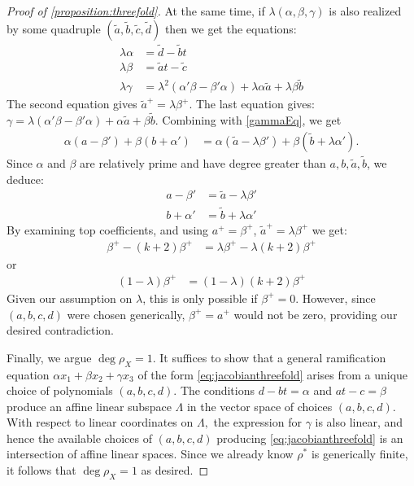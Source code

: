 \documentclass[11pt,reqno]{amsart}
\theoremstyle{plain}
\theoremstyle{definition}
\theoremstyle{remark}
\numberwithin{equation}{section}
\numberwithin{equation}{section}
\begin{document}
\begin{proof}[Proof of \autoref{proposition:threefold}]
	  At the same time, if $\lambda(\alpha, \beta, \gamma)$ is also realized by some quadruple $(\tilde{a}, \tilde{b}, \tilde{c}, \tilde{d})$ then we get the equations: 
	  \begin{align}\label{secondEquation}
	  	\lambda \alpha &= \tilde{d} - \tilde{b}t\\
	  	\lambda \beta &= \tilde{a}t - \tilde{c} \nonumber\\
	  	\lambda \gamma &= \lambda^{2}(\alpha'\beta - \beta' \alpha) + \lambda \alpha \tilde{a} + \lambda \beta \tilde{b}\nonumber
	  \end{align}
	  The second equation gives $\tilde{a}^{+} = \lambda \beta^{+}$.  The last equation gives: $\gamma = \lambda(\alpha'\beta - \beta' \alpha) + \alpha \tilde{a} + \beta \tilde{b}$.  Combining with \eqref{gammaEq}, we get 
	  \begin{align*}\label{alphasbetas}
	    	\alpha (a - \beta') + \beta (b + \alpha') &= \alpha(\tilde{a} - \lambda\beta') + \beta(\tilde{b} + \lambda \alpha').
	    \end{align*} 
	    Since $\alpha$ and $\beta$ are relatively prime and have degree greater than $a,b,\tilde{a},\tilde{b}$, we deduce:
	    \begin{align*}
	     	a-\beta' &= \tilde{a} - \lambda \beta'\\
	     	b+\alpha' &= \tilde{b} + \lambda \alpha'
	     \end{align*} 
	     By examining top coefficients, and using $a^{+} = \beta^{+}$, $\tilde{a}^{+} = \lambda \beta^{+}$ we get: 
	     \begin{align*}
	     	\beta^{+} - (k+2)\beta^{+} &= \lambda\beta^{+} - \lambda(k+2)\beta^{+}
	     \end{align*}
	     or 
	     \begin{align*}
	     	(1-\lambda)\beta^{+} &= (1-\lambda)(k+2)\beta^{+}
	     \end{align*}
	     Given our assumption on $\lambda$, this is only possible if $\beta^{+} = 0$.  However, since $(a,b,c,d)$ were chosen generically, $\beta^{+} = a^{+}$ would not be zero, providing our desired contradiction.

	     Finally, we argue $\deg \rho_{X} = 1$. It suffices to show that a general ramification equation $\alpha x_{1} + \beta x_{2} + \gamma x_{3}$ of the form \eqref{eq:jacobianthreefold} arises from a unique choice of polynomials $(a,b,c,d)$.  The conditions $d-bt = \alpha$ and $at-c=\beta$ produce an affine linear subspace $\Lambda$ in the vector space of choices $(a,b,c,d)$. With respect to linear coordinates on $\Lambda,$ the expression for $\gamma$ is also linear, and hence the available choices of $(a,b,c,d)$ producing \autoref{eq:jacobianthreefold} is an intersection of affine linear spaces.  Since we already know $\rho^{*}$ is generically finite, it follows that $\deg \rho_{X} = 1$ as desired.

\end{proof} 
\end{document}
